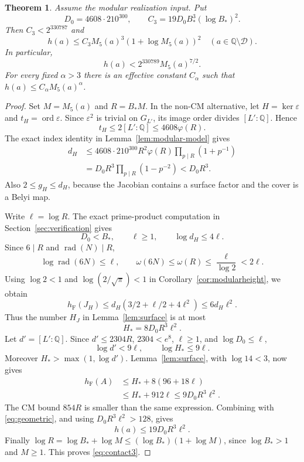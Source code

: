 \documentclass[11pt,a4paper]{article}
\newtheorem{theorem}{Theorem}[section]
\theoremstyle{definition}
\newcommand{\Q}{\mathbb Q}
\newcommand{\hF}{h_{\mathrm F}}
\newcommand{\rad}{\operatorname{rad}}
\begin{document}
\begin{theorem}\label{thm:contactheight}
Assume the modular realization input. Put
\[
 D_0=4608\cdot210^{300},\qquad
 C_3=19D_0B_*^3(\log B_*)^2.
\]
Then $C_3<2^{330787}$ and
\begin{equation}\label{eq:contact3}
 h(a)\le C_3 M_5(a)^3(1+\log M_5(a))^2
 \quad(a\in\Q\setminus\mathcal D).
\end{equation}
In particular,
\begin{equation}\label{eq:contact-seven-halves}
 h(a)<2^{330789}M_5(a)^{7/2}.
\end{equation}
For every fixed $\alpha>3$ there is an effective constant
$C_\alpha$ such that $h(a)\le C_\alpha M_5(a)^\alpha$.
\end{theorem}
\begin{proof}
Set $M=M_5(a)$ and $R=B_*M$. In the non-CM alternative, let
$H=\ker\varepsilon$ and $t_H=\operatorname{ord}\varepsilon$.
Since $\varepsilon^2$ is trivial on $G_{L'}$, its image order
divides $[L':\Q]$. Hence
\[
 t_H\le2[L':\Q]\le4608\varphi(R).
\]
The exact index identity in Lemma~\ref{lem:modular-model} gives
\begin{equation}\label{eq:cubic-degree}
 \begin{split}
 d_H
 &\le4608\cdot210^{300}R^2\varphi(R)
                    \prod_{p\mid R}(1+p^{-1})\\
 &=D_0R^3\prod_{p\mid R}(1-p^{-2})<D_0R^3.
 \end{split}
\end{equation}
Also $2\le g_H\le d_H$, because the Jacobian contains a surface
factor and the cover is a Belyi map.

Write $\ell=\log R$. The exact prime-product computation in
Section~\ref{sec:verification} gives
\[
 D_0<B_*,\qquad \ell\ge1,\qquad \log d_H\le4\ell.
\]
Since $6\mid R$ and $\rad(N)\mid R$,
\[
 \log\rad(6N)\le\ell,\qquad
 \omega(6N)\le\omega(R)\le\frac\ell{\log2}<2\ell.
\]
Using $\log2<1$ and $\log(2/\sqrt\pi)<1$ in
Corollary~\ref{cor:modularheight}, we obtain
\begin{equation}\label{eq:jacobian-numeric}
 \hF(J_H)\le
 d_H(3/2+\ell/2+4\ell^2)\le6d_H\ell^2.
\end{equation}
Thus the number $H_J$ in Lemma~\ref{lem:surface} is at most
\[
 H_*=8D_0R^3\ell^2.
\]
Let $d'=[L':\Q]$. Since $d'\le2304R$, $2304<e^8$,
$\ell\ge1$, and $\log D_0\le\ell$,
\[
 \log d'<9\ell,\qquad
 \log H_*\le9\ell.
\]
Moreover $H_*>\max(1,\log d')$.
Lemma~\ref{lem:surface}, with $\log14<3$, now gives
\[
 \begin{split}
 \hF(A)
 &\le H_*+8(96+18\ell)\\
 &\le H_*+912\ell
 \le9D_0R^3\ell^2.
 \end{split}
\]
The CM bound $854R$ is smaller than the same expression.
Combining with \eqref{eq:geometric}, and using
$D_0R^3\ell^2>128$, gives
\[
 h(a)\le19D_0R^3\ell^2.
\]
Finally $\log R=\log B_*+\log M\le
(\log B_*)(1+\log M)$, since $\log B_*>1$ and $M\ge1$.
This proves \eqref{eq:contact3}.


\end{proof}
\end{document}
